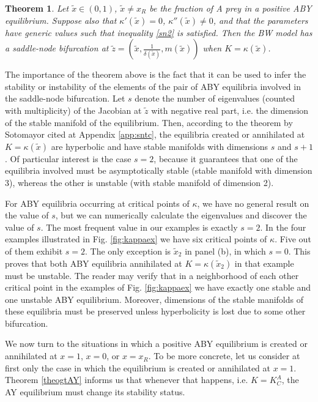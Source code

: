 \documentclass[12pt]{article}
\newtheorem{theorem}{Theorem}[section]
\theoremstyle{definition}
\begin{document}
\begin{theorem}  \label{thsn}
	Let $\tilde{x} \in(0,1)$, $\tilde{x}\neq x_R$ be the fraction of A prey in a positive ABY equilibrium. Suppose also that $\kappa'(\tilde{x})=0$, $\kappa''(\tilde{x}) \neq 0$, and that the parameters have generic values such that inequality \eqref{sn2} is satisfied. Then the BW model has a saddle-node bifurcation at $\tilde{z}=(\tilde{x}, \frac{1}{\delta(\tilde{x})}, m(\tilde{x}))$ when $K=\kappa(\tilde{x})$.
\end{theorem}

The importance of the theorem above is the fact that it can be used to infer the stability or instability of the elements of the pair of ABY equilibria involved in the saddle-node bifurcation. Let $s$ denote the number of eigenvalues (counted with multiplicity) of the Jacobian at $\tilde{z}$ with negative real part, i.e. the dimension of the stable manifold of the equilibrium. Then, according to the theorem by Sotomayor \cite{sotomayor} cited at Appendix \ref{app:sntc}, the equilibria created or annihilated at $K=\kappa(\tilde{x})$ are hyperbolic and have stable manifolds with dimensions $s$ and $s+1$. Of particular interest is the case $s=2$, because it guarantees that one of the equilibria involved must be asymptotically stable (stable manifold with dimension 3), whereas the other is unstable (with stable manifold of dimension 2).

For ABY equilibria occurring at critical points of $\kappa$, we have no general result on the value of $s$, but we can numerically calculate the eigenvalues and discover the value of $s$. The most frequent value in our examples is exactly $s=2$. In the four examples illustrated in Fig. \ref{fig:kappaex} we have six critical points of $\kappa$. Five out of them exhibit $s=2$. The only exception is $\tilde{x}_2$ in panel (b), in which $s=0$. This proves that both ABY equilibria annihilated at $K=\kappa(\tilde{x}_2)$ in that example must be unstable. The reader may verify that in a neighborhood of each other critical point in the examples of Fig. \ref{fig:kappaex} we have exactly one stable and one unstable ABY equilibrium. Moreover, dimensions of the stable manifolds of these equilibria must be preserved unless hyperbolicity is lost due to some other bifurcation.

We now turn to the situations in which a positive ABY equilibrium is created or annihilated at $x=1$, $x=0$, or $x=x_R$. To be more concrete, let us consider at first only the case in which the equilibrium is created or annihilated at $x=1$. Theorem \ref{theogtAY} informs us that whenever that happens, i.e. $K=K^A_C$, the AY equilibrium must change its stability status. 
\end{document}
